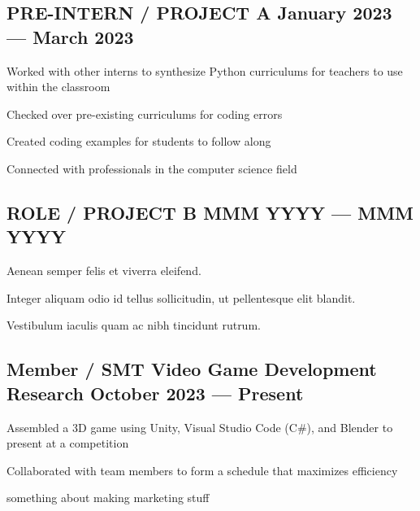 \subsection{{PRE-INTERN / PROJECT A \hfill January 2023 --- March 2023}}
\begin{zitemize}
\item Worked with other interns to synthesize Python curriculums for teachers to use within the classroom
\item Checked over pre-existing curriculums for coding errors
\item Created coding examples for students to follow along
\item Connected with professionals in the computer science field
\end{zitemize}

\subsection{{ROLE / PROJECT B \hfill MMM YYYY --- MMM YYYY}}
\begin{zitemize}
\item Aenean semper felis et viverra eleifend.
\item Integer aliquam odio id tellus sollicitudin, ut pellentesque elit blandit.
\item Vestibulum iaculis quam ac nibh tincidunt rutrum.
\end{zitemize}

\subsection{{Member / SMT Video Game Development Research \hfill October 2023 --- Present}}
\begin{zitemize}
\item Assembled a 3D game using Unity, Visual Studio Code (C\#), and Blender to present at a competition
\item Collaborated with team members to form a schedule that maximizes efficiency
\item something about making marketing stuff
\end{zitemize}

